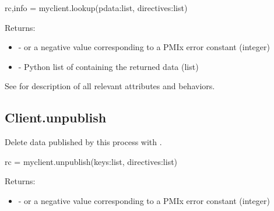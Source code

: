 \format

\pyspecificstart
\begin{codepar}
rc,info = myclient.lookup(pdata:list, directives:list)
\end{codepar}
\pyspecificend

\begin{arglist}
\end{arglist}

Returns:

\begin{itemize}
    \item {} -  or a negative value corresponding to a PMIx error constant (integer)
    \item {} - Python list of  containing the returned data (list)
\end{itemize}

See  for description of all relevant attributes and behaviors.


\subsection{Client.unpublish}

\summary

Delete data published by this process with .

\format

\pyspecificstart
\begin{codepar}
rc = myclient.unpublish(keys:list, directives:list)
\end{codepar}
\pyspecificend

\begin{arglist}
\end{arglist}

Returns:

\begin{itemize}
    \item {} -  or a negative value corresponding to a PMIx error constant (integer)
\end{itemize}


